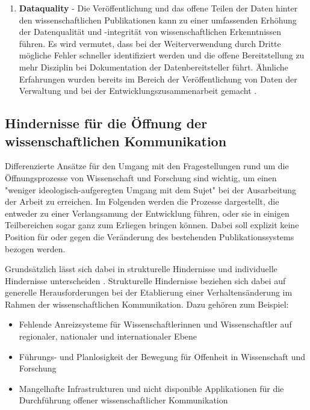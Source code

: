 \begin{enumerate}
\item \textbf{Dataquality} - Die Veröffentlichung und das offene Teilen der Daten hinter den wissenschaftlichen Publikationen kann zu einer umfassenden Erhöhung der Datenqualität und -integrität von wissenschaftlichen Erkenntnissen führen. Es wird vermutet, dass bei der Weiterverwendung durch Dritte mögliche Fehler schneller identifiziert werden und die offene Bereitstellung zu mehr Disziplin bei Dokumentation der Datenbereitsteller führt. Ähnliche Erfahrungen wurden bereits im Bereich der Veröffentlichung von Daten der Verwaltung und bei der Entwicklungszusammenarbeit gemacht \cite{heise_2014_bundestag}.
\end{enumerate}

\subsection{Hindernisse für die Öffnung der wissenschaftlichen Kommunikation}

Differenzierte Ansätze für den Umgang mit den Fragestellungen rund um die Öffnungsprozesse von Wissenschaft und Forschung sind wichtig, um einen "weniger ideologisch-aufgeregten Umgang mit dem Sujet" \cite[:13]{naeder_2010_open} bei der Ausarbeitung der Arbeit zu erreichen. Im Folgenden werden die Prozesse dargestellt, die entweder zu einer Verlangsamung der Entwicklung führen, oder sie in einigen Teilbereichen sogar ganz zum Erliegen bringen können. Dabei soll explizit keine Position für oder gegen die Veränderung des bestehenden Publikationssystems bezogen werden.

Grundsätzlich lässt sich dabei in strukturelle Hindernisse und individuelle Hindernisse unterscheiden \cite{Scheliga_2014}. Strukturelle Hindernisse beziehen sich dabei auf generelle Herausforderungen bei der Etablierung einer Verhaltensänderung im Rahmen der wissenschaftlichen Kommunikation. Dazu gehören zum Beispiel:
\begin{itemize}
\item Fehlende Anreizsysteme für Wissenschaftlerinnen und Wissenschaftler auf regionaler, nationaler und internationaler Ebene
\item Führungs- und Planlosigkeit der Bewegung für Offenheit in Wissenschaft und Forschung
\item Mangelhafte Infrastrukturen und nicht disponible Applikationen für die Durchführung offener wissenschaftlicher Kommunikation
\end{itemize}

